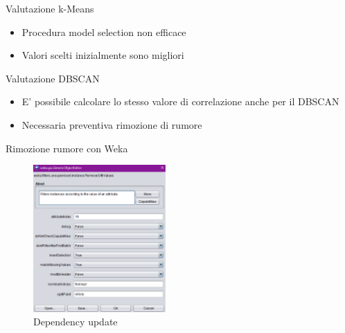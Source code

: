 \documentclass{beamer}
\begin{document}
\begin{frame}{Valutazione k-Means} 
    \begin{itemize}
      \item Procedura model selection non efficace
      \item Valori scelti inizialmente sono migliori
    \end{itemize} 
\end{frame}

\begin{frame}{Valutazione DBSCAN} 
  \begin{itemize}
    \item E' possibile calcolare lo stesso valore di correlazione anche per il DBSCAN
    \item Necessaria preventiva rimozione di rumore
  \end{itemize} 
\end{frame}

\begin{frame}{Rimozione rumore con Weka}
  \begin{figure}[bt]
    \begin{center}
    \includegraphics[width = 0.45\textwidth]{../img/filter-for-remove-noise.pdf}
    \caption{Dependency update}
    \end{center}
  \end{figure}
\end{frame}
\end{document}
